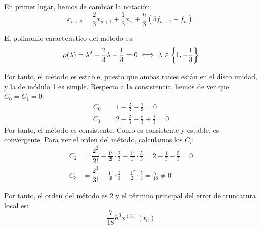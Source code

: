 \begin{ejercicio}
\begin{enumerate}
        En primer lugar, hemos de cambiar la notación:
        \begin{equation*}
            x_{n+2} = \frac{2}{3} x_{n+1} + \frac{1}{3} x_n + \frac{h}{3} (5 f_{n+1} - f_n).
        \end{equation*}

        El polinomio característico del método es:
        \begin{equation*}
            p(\lambda) = \lambda^2 - \frac{2}{3}\lambda - \frac{1}{3} = 0\iff \lambda \in \left\{1,-\frac{1}{3}\right\}
        \end{equation*}

        Por tanto, el método es estable, puesto que ambas raíces están en el disco unidad, y la de módulo 1 es simple.
        Respecto a la consistencia, hemos de ver que $C_0=C_1=0$:
        \begin{align*}
            C_0 &= 1 - \frac{2}{3} - \frac{1}{3} = 0 \\
            C_1 &= 2 - \frac{2}{3} - \frac{5}{3} + \frac{1}{3} = 0
        \end{align*}
        Por tanto, el método es consistente. Como es consistente y estable, es convergente. Para ver el orden del método, calculamos los $C_i$:
        \begin{align*}
            C_2 &= \dfrac{2^2}{2!} - \frac{1^2}{2!}\cdot\frac{2}{3} - \frac{1^1}{1!}\cdot\frac{5}{3} = 2 - \frac{1}{3} - \frac{5}{3} = 0\\
            C_3 &= \dfrac{2^3}{3!} - \frac{1^3}{3!}\cdot\frac{2}{3} - \frac{1^2}{2!}\cdot\frac{5}{3} = \frac{7}{18}\neq 0
        \end{align*}

        Por tanto, el orden del método es 2 y el término principal del error de truncatura local es:
        \begin{equation*}
            \frac{7}{18}h^3x^{(3)}(t_n)
        \end{equation*}

    \end{enumerate}
\end{ejercicio}

